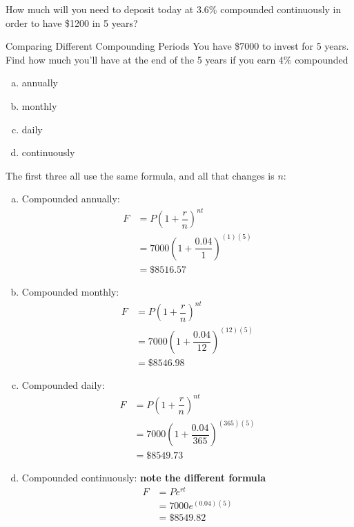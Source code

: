 \begin{try}
How much will you need to deposit today at 3.6\% compounded continuously in order to have \$1200 in 5 years?
\end{try}
\vfill
\text{}
\vfill
\pagebreak

\begin{example}[https://www.youtube.com/watch?v=OuC95ArdH5g&list=PLfmpjsIzhztsZtnb7HnXrQ8SLoiOCIcAM&index=22]{Comparing Different Compounding Periods}
You have \$7000 to invest for 5 years.  Find how much you'll have at the end of the 5 years if you earn 4\% compounded
\begin{enumerate}[(a)]
\item annually
\item monthly
\item daily
\item continuously
\end{enumerate}

\sol
The first three all use the same formula, and all that changes is $n$:
\begin{enumerate}[(a)]
\item Compounded annually:
\begin{align*}
F &= P\left(1+\dfrac{r}{n}\right)^{nt}\\
&= 7000\left(1+\dfrac{0.04}{1}\right)^{(1)(5)}\\
&= \$8516.57
\end{align*}

\item Compounded monthly:
\begin{align*}
F &= P\left(1+\dfrac{r}{n}\right)^{nt}\\
&= 7000\left(1+\dfrac{0.04}{12}\right)^{(12)(5)}\\
&= \$8546.98
\end{align*}

\item Compounded daily:
\begin{align*}
F &= P\left(1+\dfrac{r}{n}\right)^{nt}\\
&= 7000\left(1+\dfrac{0.04}{365}\right)^{(365)(5)}\\
&= \$8549.73
\end{align*}

\item Compounded continuously: \textbf{note the different formula}
\begin{align*}
F &= Pe^{rt}\\
&= 7000e^{(0.04)(5)}\\
&= \$8549.82
\end{align*}
\end{enumerate}
\end{example}


